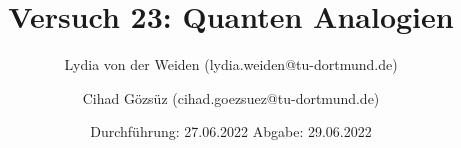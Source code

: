 

\subject{Fortgeschrittenenpraktikum der Fakultät Physik}
\title{Versuch 23: Quanten Analogien}
\author{Lydia von der Weiden (lydia.weiden@tu-dortmund.de) \and Cihad Gözsüz (cihad.goezsuez@tu-dortmund.de)}
\date{
  Durchführung: 27.06.2022
  \hspace{3em}
  Abgabe: 29.06.2022
}
\publishers{TU Dortmund – Fakultät Physik}



\maketitle
\thispagestyle{empty}
\tableofcontents
\newpage
\nocite{anleitung}





\newpage
\printbibliography{}
\nocite{matplotlib}
\nocite{seaborn}
\nocite{numpy}
\nocite{sympy}

